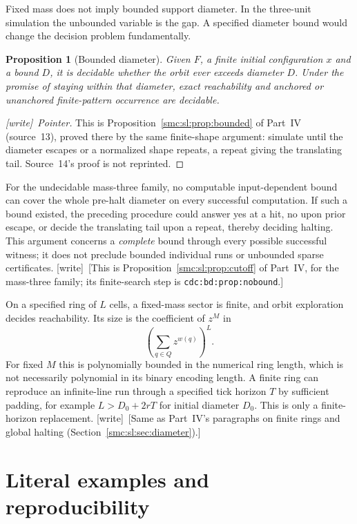 \documentclass[11pt,letterpaper]{article}
\numberwithin{equation}{section}
\newtheorem{proposition}[theorem]{Proposition}
\theoremstyle{definition}
\theoremstyle{remark}
\newcommand{\wtag}{\textup{[write]}}
\begin{document}
Fixed mass does not imply bounded support diameter. In the three-unit simulation the unbounded variable is the gap. A specified diameter bound would change the decision problem fundamentally.

\begin{proposition}[Bounded diameter]\label{smc:tm:prop:bounded}
Given $F$, a finite initial configuration $x$ and a bound $D$, it is decidable whether the orbit ever exceeds diameter $D$. Under the promise of staying within that diameter, exact reachability and anchored or unanchored finite-pattern occurrence are decidable.
\end{proposition}
\begin{proof}[\wtag\ Pointer]
This is Proposition~\ref{smc:sl:prop:bounded} of Part~IV (source~13), proved there by the same finite-shape argument: simulate until the diameter escapes or a normalized shape repeats, a repeat giving the translating tail. Source~14's proof is not reprinted.
\end{proof}

For the undecidable mass-three family, no computable input-dependent bound can cover the whole pre-halt diameter on every successful computation. If such a bound existed, the preceding procedure could answer yes at a hit, no upon prior escape, or decide the translating tail upon a repeat, thereby deciding halting. This argument concerns a \emph{complete} bound through every possible successful witness; it does not preclude bounded individual runs or unbounded sparse certificates.
\wtag\ [This is Proposition~\ref{smc:sl:prop:cutoff} of Part~IV, for the mass-three family; its finite-search step is \texttt{cdc:bd:prop:nobound}.]

On a specified ring of $L$ cells, a fixed-mass sector is finite, and orbit exploration decides reachability. Its size is the coefficient of $z^M$ in
\[
\left(\sum_{q\in Q}z^{w(q)}\right)^L.
\]
For fixed $M$ this is polynomially bounded in the numerical ring length, which is not necessarily polynomial in its binary encoding length. A finite ring can reproduce an infinite-line run through a specified tick horizon $T$ by sufficient padding, for example $L>D_0+2rT$ for initial diameter $D_0$. This is only a finite-horizon replacement.
\wtag\ [Same as Part~IV's paragraphs on finite rings and global halting (Section~\ref{smc:sl:sec:diameter}).]

\section{Literal examples and reproducibility}\label{smc:tm:sec:repro}
\end{document}
